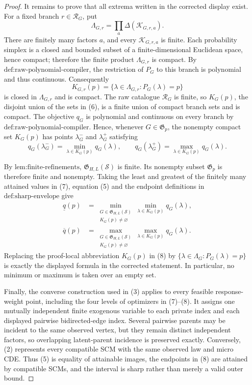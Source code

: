 \documentclass{article}
\begin{document}
\begin{proof}
It remains to prove that all extrema written in the corrected display exist.  For a fixed branch \(r\in\mathcal R_G\), put
\[
\Lambda_{G,r}=\prod_a\Delta(\mathcal K_{G,r,a}).
\]
There are finitely many factors \(a\), and every \(\mathcal K_{G,r,a}\) is finite.  Each probability simplex is a closed and bounded subset of a finite-dimensional Euclidean space, hence compact; therefore the finite product \(\Lambda_{G,r}\) is compact.  By \(\text{def:raw-polynomial-compiler}\), the restriction of \(P_G\) to this branch is polynomial and thus continuous.  Consequently
\[
K_{G,r}(p)=\{\lambda\in\Lambda_{G,r}:P_G(\lambda)=p\}
\tag{6}
\]
is closed in \(\Lambda_{G,r}\) and is compact.  The raw catalogue \(\mathcal R_G\) is finite, so \(K_G(p)\), the disjoint union of the sets in (6), is a finite union of compact branch sets and is compact.  The objective \(q_G\) is polynomial and continuous on every branch by \(\text{def:raw-polynomial-compiler}\).  Hence, whenever \(G\in\mathfrak G_p\), the nonempty compact set \(K_G(p)\) has points \(\lambda_G^-\) and \(\lambda_G^+\) satisfying
\[
q_G(\lambda_G^-)=\min_{\lambda\in K_G(p)}q_G(\lambda),
\qquad
q_G(\lambda_G^+)=\max_{\lambda\in K_G(p)}q_G(\lambda).
\tag{7}
\]

By \(\text{lem:finite-refinements}\), \(\mathfrak G_{H,L}(\mathcal S)\) is finite.  Its nonempty subset \(\mathfrak G_p\) is therefore finite and nonempty.  Taking the least and greatest of the finitely many attained values in (7), equation (5) and the endpoint definitions in \(\text{def:sharp-envelope}\) give
\[
\begin{aligned}
\underline q(p)
&=\min_{\substack{G\in\mathfrak G_{H,L}(\mathcal S)\\K_G(p)\ne\varnothing}}
  \min_{\lambda\in K_G(p)}q_G(\lambda),\\
\overline q(p)
&=\max_{\substack{G\in\mathfrak G_{H,L}(\mathcal S)\\K_G(p)\ne\varnothing}}
  \max_{\lambda\in K_G(p)}q_G(\lambda).
\end{aligned}
\tag{8}
\]
Replacing the proof-local abbreviation \(K_G(p)\) in (8) by \(\{\lambda\in\Lambda_G:P_G(\lambda)=p\}\) is exactly the displayed formula in the corrected statement.  In particular, no minimum or maximum is taken over an empty set.

Finally, the converse construction used in (3) applies to every feasible response-weight point, including the four levels of optimizers in (7)--(8).  It assigns one mutually independent finite exogenous variable to each private index and each displayed pairwise bidirected-edge index.  Several pairwise parents may be incident to the same observed vertex, but they remain distinct independent factors, so overlapping latent-parent incidence is preserved exactly.  Conversely, (2) represents every compatible SCM with the same observed law and micro CDE.  Thus (5) is equality of attainable images, the endpoints in (8) are attained by compatible SCMs, and the interval is sharp rather than merely a valid outer bound.
\end{proof}
\end{document}
